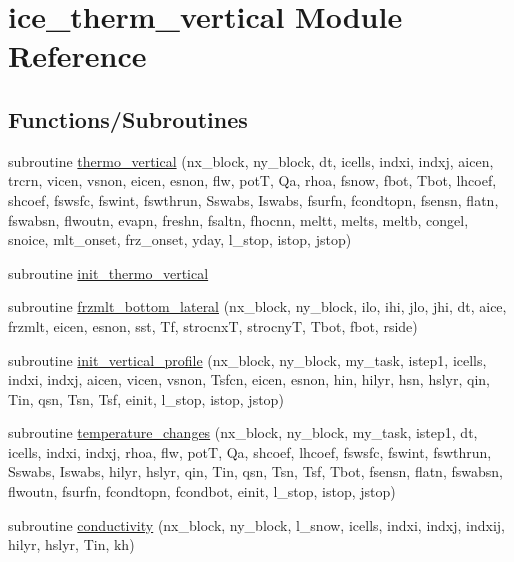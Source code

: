 \hypertarget{namespaceice__therm__vertical}{
\section{ice\_\-therm\_\-vertical Module Reference}
\label{namespaceice__therm__vertical}
}
\subsection*{Functions/Subroutines}
\begin{DoxyCompactItemize}
\item 
subroutine \hyperlink{namespaceice__therm__vertical_a6a3853686daba96faa929c71f0a65cd6}{thermo\_\-vertical} (nx\_\-block, ny\_\-block, dt, icells, indxi, indxj, aicen, trcrn, vicen, vsnon, eicen, esnon, flw, potT, Qa, rhoa, fsnow, fbot, Tbot, lhcoef, shcoef, fswsfc, fswint, fswthrun, Sswabs, Iswabs, fsurfn, fcondtopn, fsensn, flatn, fswabsn, flwoutn, evapn, freshn, fsaltn, fhocnn, meltt, melts, meltb, congel, snoice, mlt\_\-onset, frz\_\-onset, yday, l\_\-stop, istop, jstop)
\item 
subroutine \hyperlink{namespaceice__therm__vertical_a1123b2b5ee24c8b82a26c5a831c88405}{init\_\-thermo\_\-vertical}
\item 
subroutine \hyperlink{namespaceice__therm__vertical_ae86ac5bb13d456664da2d8a1aae2f80c}{frzmlt\_\-bottom\_\-lateral} (nx\_\-block, ny\_\-block, ilo, ihi, jlo, jhi, dt, aice, frzmlt, eicen, esnon, sst, Tf, strocnxT, strocnyT, Tbot, fbot, rside)
\item 
subroutine \hyperlink{namespaceice__therm__vertical_a9e8915673a763c6533b1bf688775f02c}{init\_\-vertical\_\-profile} (nx\_\-block, ny\_\-block, my\_\-task, istep1, icells, indxi, indxj, aicen, vicen, vsnon, Tsfcn, eicen, esnon, hin, hilyr, hsn, hslyr, qin, Tin, qsn, Tsn, Tsf, einit, l\_\-stop, istop, jstop)
\item 
subroutine \hyperlink{namespaceice__therm__vertical_afe7e9128dd994fd74827b779ddeaf789}{temperature\_\-changes} (nx\_\-block, ny\_\-block, my\_\-task, istep1, dt, icells, indxi, indxj, rhoa, flw, potT, Qa, shcoef, lhcoef, fswsfc, fswint, fswthrun, Sswabs, Iswabs, hilyr, hslyr, qin, Tin, qsn, Tsn, Tsf, Tbot, fsensn, flatn, fswabsn, flwoutn, fsurfn, fcondtopn, fcondbot, einit, l\_\-stop, istop, jstop)
\item 
subroutine \hyperlink{namespaceice__therm__vertical_aeeb37e6f39ffa2d7269ac471d047a789}{conductivity} (nx\_\-block, ny\_\-block, l\_\-snow, icells, indxi, indxj, indxij, hilyr, hslyr, Tin, kh)

\end{DoxyCompactItemize}
